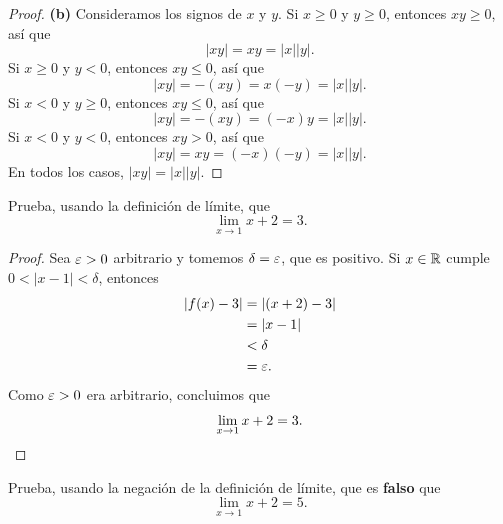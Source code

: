 \documentclass[12pt,a4paper]{article}
\begin{document}
\begin{proof}
        \textbf{(b)} Consideramos los signos de $x$ y $y$. Si $x\geq0$ y $y\geq0$, entonces $xy\geq0$, así que
        \begin{equation*}
            |xy|=xy=|x||y|.
        \end{equation*}
        Si $x\geq0$ y $y<0$, entonces $xy\leq0$, así que
        \begin{equation*}
            |xy|=-(xy)=x(-y)=|x||y|.
        \end{equation*}
        Si $x<0$ y $y\geq0$, entonces $xy\leq0$, así que
        \begin{equation*}
            |xy|=-(xy)=(-x)y=|x||y|.
        \end{equation*}
        Si $x<0$ y $y<0$, entonces $xy>0$, así que
        \begin{equation*}
            |xy|=xy=(-x)(-y)=|x||y|.
        \end{equation*}
        En todos los casos, $|xy|=|x||y|$.
    \end{proof}

    \begin{problema}
        Prueba, usando la definición de límite, que
        \begin{equation*}
            \lim_{x\to1}x+2=3.
        \end{equation*}
    \end{problema}

    \begin{proof}
        Sea $\varepsilon>0$ arbitrario y tomemos $\delta=\varepsilon$, que es positivo. Si $x\in\mathbb{R}$ cumple $0<|x-1|<\delta$, entonces
        \begin{align*}
            |f(x)-3|&=|(x+2)-3|\\
            &=|x-1|\\
            &<\delta\\
            &=\varepsilon.
        \end{align*}
        Como $\varepsilon>0$ era arbitrario, concluimos que
        \begin{equation*}
            \lim_{x\to1}x+2=3.\qedhere
        \end{equation*}
    \end{proof}

    \begin{problema}
        Prueba, usando la negación de la definición de límite, que es \textbf{falso} que
        \begin{equation*}
            \lim_{x\to1}x+2=5.
        \end{equation*}
    \end{problema}
\end{document}
